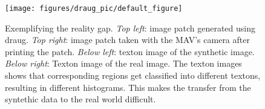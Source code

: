 \begin{figure}[h!]
\begin{center}
\texttt{[image: figures/draug\_pic/default\_figure]}
\caption{{\label{fig:realitygap} Exemplifying the reality
    gap. \emph{Top left}: image patch generated using draug. \emph{Top
      right}: image patch taken with the MAV's camera after printing
    the patch. \emph{Below left}: texton image of the synthetic
    image. \emph{Below right}: Texton image of the real image. The
    texton images shows that corresponding regions get classified into
    different textons, resulting in different histograms. This makes
    the transfer from the syntethic data to the real world difficult.%
}}
\end{center}
\end{figure}

